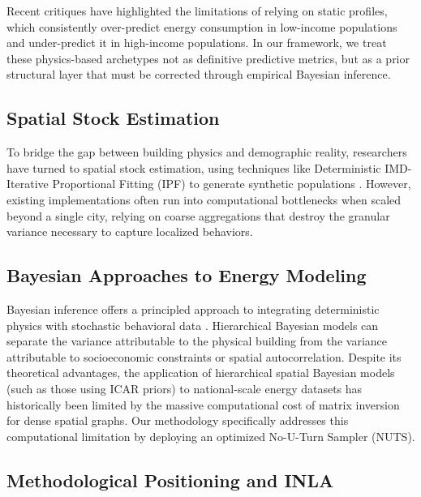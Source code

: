 \documentclass[11pt, a4paper, twocolumn, numbers]{elsarticle}
\begin{document}
Recent critiques \cite{Ward2019} have highlighted the limitations of relying on static profiles, which consistently over-predict energy consumption in low-income populations and under-predict it in high-income populations. In our framework, we treat these physics-based archetypes not as definitive predictive metrics, but as a prior structural layer that must be corrected through empirical Bayesian inference.

\subsection{Spatial Stock Estimation}\label{spatial-stock-estimation}

To bridge the gap between building physics and demographic reality, researchers have turned to spatial stock estimation, using techniques like Deterministic IMD-Iterative Proportional Fitting (IPF) to generate synthetic populations \cite{NetoBradley2021}. However, existing implementations often run into computational bottlenecks when scaled beyond a single city, relying on coarse aggregations that destroy the granular variance necessary to capture localized behaviors. 

\subsection{Bayesian Approaches to Energy Modeling}\label{bayesian-approaches-to-energy-modeling}

Bayesian inference offers a principled approach to integrating deterministic physics with stochastic behavioral data \cite{Booth2013, petrou2024bayesian}. Hierarchical Bayesian models can separate the variance attributable to the physical building from the variance attributable to socioeconomic constraints or spatial autocorrelation. Despite its theoretical advantages, the application of hierarchical spatial Bayesian models (such as those using ICAR priors) to national-scale energy datasets has historically been limited by the massive computational cost of matrix inversion for dense spatial graphs. Our methodology specifically addresses this computational limitation by deploying an optimized No-U-Turn Sampler (NUTS).

\subsection{Methodological Positioning and INLA}\label{methodological-positioning}
\end{document}
